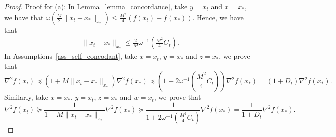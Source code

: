 \documentclass[11pt,letterpaper]{article}
\newcommand\0{{\Vector{0}}}
\newcommand\1{{\Vector{1}}}
\numberwithin{assumption}{section}
\numberwithin{definition}{section}
\numberwithin{theorem}{section}
\numberwithin{remark}{section}
\begin{document}
\begin{proof}

    Proof for (a): In Lemma~\ref{lemma_concordance}, take $y = x_t$ and $x = x_*$, we have that $\omega(\frac{M}{2}\|x_t - x_*\|_{x_*}) \leq \frac{M^2}{4}(f(x_t) - f(x_*))$. Hence, we have that
    \begin{align*}
        \|x_t - x_*\|_{x_*} \leq \frac{2}{M}\omega^{-1}(\frac{M^2}{4}C_t).
    \end{align*}
    In Assumptions~\ref{ass_self_concodant}, take $x = x_t$, $y = x_*$ and $z = x_*$, we prove that 
    \begin{equation}
        \nabla^2{f(x_t)} \preceq (1 + M\|x_t - x_*\|_{x_*})\nabla^2{f(x_*)} \preceq (1 + 2\omega^{-1}(\frac{M^2}{4}C_t))\nabla^2{f(x_*)} = (1 + D_t)\nabla^2{f(x_*)}.
    \end{equation}
    Similarly, take $x = x_*$, $y = x_t$, $z = x_*$ and $w = x_t$, we prove that 
    \begin{equation}
        \nabla^2{f(x_t)} \succeq \frac{1}{1 + M\|x_t - x_*\|_{x_*}}\nabla^2{f(x_*)} \succeq \frac{1}{1 + 2\omega^{-1}(\frac{M^2}{4}C_t)}\nabla^2{f(x_*)} = \frac{1}{1 + D_t}\nabla^2{f(x_*)}.
    \end{equation}


\end{proof}
\end{document}
